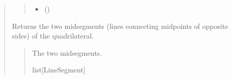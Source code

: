 \documentclass[letterpaper,10pt,english]{sphinxmanual}
\begin{document}
\begin{quote}
\begin{fulllineitems}
\begin{quote}
\begin{description}
\begin{itemize}
\item {} 
\sphinxAtStartPar
{} ()

\end{itemize}

\end{description}\end{quote}

\begin{fulllineitems}
\label{\detokenize{pygeox:pygeox.custom_objects.Quadrilateral.diagonals}}
\pysigstartsignatures
\pysigline
{}
\pysigstopsignatures
\end{fulllineitems}


\begin{fulllineitems}
\label{\detokenize{pygeox:pygeox.custom_objects.Quadrilateral.midsegments}}
\pysigstartsignatures
\pysigline
{}
\pysigstopsignatures
\sphinxAtStartPar
Returns the two midsegments (lines connecting midpoints of opposite sides) of the quadrilateral.
\begin{quote}\begin{description}
\sphinxAtStartPar
The two midsegments.

\sphinxAtStartPar
list{[}LineSegment{]}

\end{description}\end{quote}

\end{fulllineitems}


\end{fulllineitems}



\end{quote}
\end{document}
